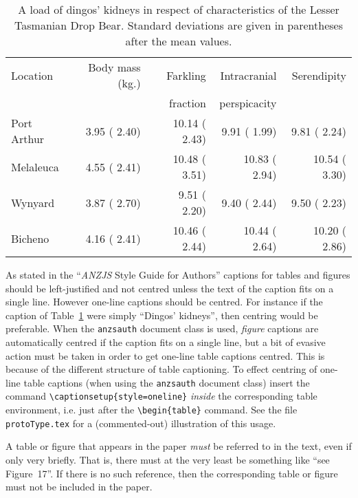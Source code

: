 \documentclass[times, doublespace]{anzsauth}
\begin{document}
\begin{table}[htp]
\caption{\label{tab:ltdb} A load of dingos' kidneys in respect
of characteristics of the Lesser Tasmanian Drop Bear.  Standard
deviations are given in parentheses after the mean values.}
\centering
\begin{tabular}{|l|r|r|r|r|} \hline
Location & Body mass (kg.) & Farkling & Intracranial & Serendipity \\ 
         &                 & fraction & perspicacity &             \\ \hline
Port Arthur &  3.95 ( 2.40) & 10.14 ( 2.43) &  9.91 ( 1.99) &  9.81 ( 2.24) \\ 
  Melaleuca &  4.55 ( 2.41) & 10.48 ( 3.51) & 10.83 ( 2.94) & 10.54 ( 3.30) \\ 
  Wynyard &  3.87 ( 2.70) &  9.51 ( 2.20) &  9.40 ( 2.44) &  9.50 ( 2.23) \\ 
  Bicheno &  4.16 ( 2.41) & 10.46 ( 2.44) & 10.44 ( 2.64) & 10.20 ( 2.86) \\ 
   \hline
\end{tabular}
\end{table}
As stated in the ``\textit{ANZJS} Style Guide for Authors''
captions for tables and figures should be left-justified and not
centred unless the text of the caption fits on a single line.
However one-line captions should be centred.  For instance if the
caption of Table~\ref{tab:ltdb} were simply ``Dingos' kidneys'',
then centring would be preferable.  When the \texttt{anzsauth}
document class is used, \emph{figure} captions are automatically
centred if the caption fits on a single line, but a bit of
evasive action must be taken in order to get one-line table
captions centred.  This is because of the different structure of
table captioning.  To effect centring of one-line table captions
(when using the \texttt{anzsauth} document class) insert the command
\verb!\captionsetup{style=oneline}! \emph{inside} the corresponding
table environment, i.e. just after the \verb!\begin{table}! command.
See the file \texttt{protoType.tex} for a (commented-out)
illustration of this usage.

A table or figure that appears in the paper \emph{must} be referred
to in the text, even if only very briefly.  That is, there must
at the very least be something like ``see Figure~17''.  If there
is no such reference, then the corresponding table or figure must
not be included in the paper.
\end{document}
